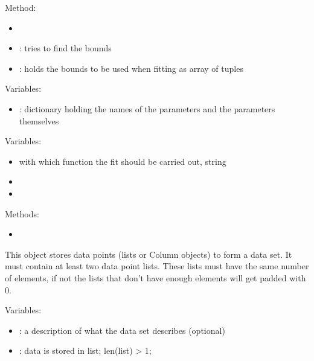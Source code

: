 \documentclass[letterpaper,10pt,english]{sphinxmanual}
\begin{document}

Method:
\begin{itemize}
\item {} 

\item {} 
: tries to find the bounds

\item {} 
: holds the bounds to be used when fitting as array of tuples

\end{itemize}

Variables:
\begin{itemize}
\item {} 
: dictionary holding the names of the parameters and the parameters themselves

\end{itemize}


Variables:
\begin{itemize}
\item {} 
 with which function the fit should be carried out, string

\item {} 

\item {} 

\end{itemize}

Methods:
\begin{itemize}
\item {} 

\end{itemize}


This object stores data points (lists or Column objects) to form a data set. It must contain at least two data point lists. These lists must have the same number of elements, if not the lists that don’t have enough elements will get padded with 0.

Variables:
\begin{itemize}
\item {} 
: a description of what the data set describes (optional)

\item {} 
: data is stored in list; len(list) \textgreater{} 1;

\end{itemize}
\end{document}
